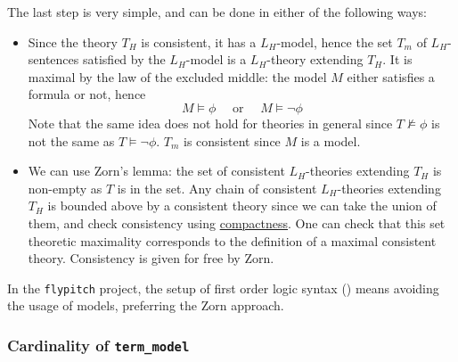 \documentclass{article}
\newcommand{\<}{\langle}
\renewcommand{\>}{\rangle}
\newcommand{\linkto}[2]{\hyperlink{#1}{#2}}
\theoremstyle{definitionstyle}
\theoremstyle{exercisestyle}
\theoremstyle{remarkstyle}
\begin{document}
The last step is very simple, and can be done in either of the following ways:
\begin{itemize}
  \item Since the theory $T_{H}$ is consistent, it has a $L_{H}$-model,
        hence the set $T_{m}$ of $L_{H}$-sentences satisfied by the $L_{H}$-model is a
        $L_{H}$-theory extending $T_{H}$.
        It is maximal by the law of the excluded middle:
        the model $M$ either satisfies a formula or not,
        hence
        \[ M \vDash \phi \quad \text{ or } \quad M \vDash \neg \phi \]
        Note that the same idea does not hold for theories in general
        since $T \nvDash \phi$ is not the same as $T \vDash \neg \phi$.
        $T_{m}$ is consistent since $M$ is a model.
  \item We can use Zorn's lemma: the set of consistent $L_{H}$-theories extending
        $T_{H}$ is non-empty as $T$ is in the set.
        Any chain of consistent $L_{H}$-theories extending $T_{H}$ is bounded
        above by a consistent theory since we can take the union of them,
        and check consistency using \linkto{compactness_consistency}{compactness}.
        One can check that this set theoretic maximality corresponds to
        the definition of a maximal consistent theory.
        Consistency is given for free by Zorn.
\end{itemize}
In the \texttt{flypitch} project, the setup of first order logic
syntax (\vdash) means avoiding the usage of models, preferring the Zorn approach.





\subsubsection{Cardinality of \texttt{term\_model}}




{}

\end{document}
